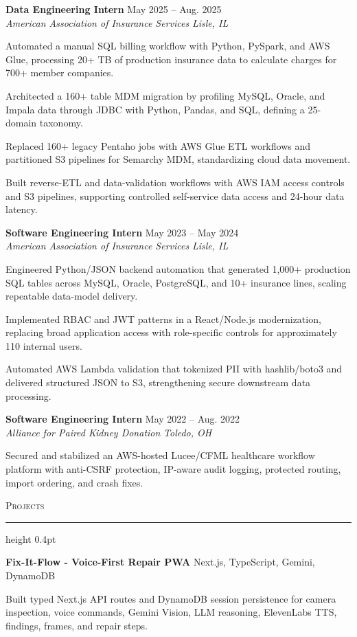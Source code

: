 \documentclass[letterpaper,11pt]{article}
\newcommand{\resumesection}[1]{%
  \par\vspace{2pt}%
  {\large\scshape #1}\par\vspace{2pt}%
  \hrule height 0.4pt\vspace{2pt}%
}
\newcommand{\resumeSubheading}[4]{
  \textbf{#1} \hfill #2\\
  \textit{#3} \hfill \textit{#4}
}
\newcommand{\projectHeading}[2]{
  \textbf{#1} \hfill #2
}
\begin{document}
\resumeSubheading
{Data Engineering Intern}{May 2025 -- Aug. 2025}
{American Association of Insurance Services}{Lisle, IL}
\begin{tightitemize}
  \item Automated a manual SQL billing workflow with Python, PySpark, and AWS Glue, processing 20+ TB of production insurance data to calculate charges for 700+ member companies.
  \item Architected a 160+ table MDM migration by profiling MySQL, Oracle, and Impala data through JDBC with Python, Pandas, and SQL, defining a 25-domain taxonomy.
  \item Replaced 160+ legacy Pentaho jobs with AWS Glue ETL workflows and partitioned S3 pipelines for Semarchy MDM, standardizing cloud data movement.
  \item Built reverse-ETL and data-validation workflows with AWS IAM access controls and S3 pipelines, supporting controlled self-service data access and 24-hour data latency.
\end{tightitemize}

\resumeSubheading
{Software Engineering Intern}{May 2023 -- May 2024}
{American Association of Insurance Services}{Lisle, IL}
\begin{tightitemize}
  \item Engineered Python/JSON backend automation that generated 1,000+ production SQL tables across MySQL, Oracle, PostgreSQL, and 10+ insurance lines, scaling repeatable data-model delivery.
  \item Implemented RBAC and JWT patterns in a React/Node.js modernization, replacing broad application access with role-specific controls for approximately 110 internal users.
  \item Automated AWS Lambda validation that tokenized PII with hashlib/boto3 and delivered structured JSON to S3, strengthening secure downstream data processing.
\end{tightitemize}

\resumeSubheading
{Software Engineering Intern}{May 2022 -- Aug. 2022}
{Alliance for Paired Kidney Donation}{Toledo, OH}
\begin{tightitemize}
  \item Secured and stabilized an AWS-hosted Lucee/CFML healthcare workflow platform with anti-CSRF protection, IP-aware audit logging, protected routing, import ordering, and crash fixes.
\end{tightitemize}

\resumesection{Projects}
\projectHeading{Fix-It-Flow - Voice-First Repair PWA}{Next.js, TypeScript, Gemini, DynamoDB}
\begin{tightitemize}
  \item Built typed Next.js API routes and DynamoDB session persistence for camera inspection, voice commands, Gemini Vision, LLM reasoning, ElevenLabs TTS, findings, frames, and repair steps.
\end{tightitemize}
\end{document}
